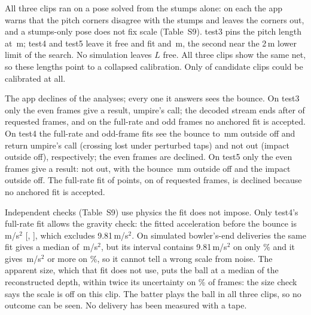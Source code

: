 \documentclass[journal]{IEEEtran}
\begin{document}
All three clips ran on a pose solved from the stumps alone: on each the app warns that the pitch corners
disagree with the stumps and leaves the corners out, and a stumps-only pose does not fix scale (Table~S9). test3
pins the pitch length at \RealTestThreeLength\,m; test4 and test5 leave it free and fit
\RealTestFourLength{} and \RealTestFiveLength\,m, the second near the 2\,m lower limit of the search.
No simulation leaves $L$ free. All three clips show the same net, so these lengths point to a
collapsed calibration. Only \RealClipsUsed{} of
\RealClipsFound{} candidate clips could be calibrated at all.

The app declines \RealDeclinedRuns{} of the \RealRuns{} analyses; every one it answers sees the bounce. On test3 only the even frames give a result, umpire's call; the decoded stream ends after
\RealTestThreeFramesUsed{} of \RealTestThreeFramesAsked{} requested frames, and on the full-rate and odd frames no anchored fit is accepted. On test4 the full-rate and odd-frame fits see the bounce
\RealTestFourPitchMin{} to \RealTestFourPitchMax\,mm outside off and return umpire's call (crossing lost under
perturbed taps) and not out (impact outside off), respectively; the even frames are declined. On test5 only the even frames give a result: not out,
with the bounce \RealTestFivePitchMin\,mm outside off and the impact outside off. The full-rate fit of \RealTestFiveTrack{}
points, on \RealTestFiveFramesUsed{} of \RealTestFiveFramesAsked{} requested frames, is declined because no anchored fit is accepted.

Independent checks (Table~S9) use physics the fit does not impose. Only test4's full-rate fit allows the gravity check:
the fitted acceleration before the bounce is \RealTestFourGrav\,m/s$^2$ [\RealTestFourGravLo,
\RealTestFourGravHi], which excludes 9.81\,m/s$^2$. On \SimGravN{} simulated bowler's-end deliveries the
same fit gives a median of \SimGravMed\,m/s$^2$, but its interval contains 9.81\,m/s$^2$ on only
\SimGravCoverPct\% and it gives \RealTestFourGrav\,m/s$^2$ or more on \SimGravHighPct\%, so it cannot tell a
wrong scale from noise. The apparent size, which that fit does not use, puts the ball at a median
\RealTestFourSizeRatio{} of the reconstructed depth, within twice its uncertainty on
\RealTestFourSizeWithinTwo\% of frames: the size check says the scale is off on this clip. The batter plays the ball
in all three clips, so no outcome can be seen. No delivery has been measured with a tape.
\end{document}
